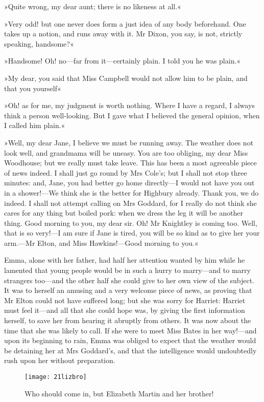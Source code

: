 »Quite wrong, my dear aunt; there is no likeness at all.«

»Very odd! but one never does form a just idea of any body beforehand. One takes up a notion, and runs away with it. Mr Dixon, you say, is not, strictly speaking, handsome?«

»Handsome! Oh! no—far from it—certainly plain. I told you he was plain.«

»My dear, you said that Miss Campbell would not allow him to be plain, and that you yourself\longdash«

»Oh! as for me, my judgment is worth nothing. Where I have a regard, I always think a person well-looking. But I gave what I believed the general opinion, when I called him plain.«

»Well, my dear Jane, I believe we must be running away. The weather does not look well, and grandmama will be uneasy. You are too obliging, my dear Miss Woodhouse; but we really must take leave. This has been a most agreeable piece of news indeed. I shall just go round by Mrs Cole's; but I shall not stop three minutes: and, Jane, you had better go home directly—I would not have you out in a shower!—We think she is the better for Highbury already. Thank you, we do indeed. I shall not attempt calling on Mrs Goddard, for I really do not think she cares for any thing but boiled pork: when we dress the leg it will be another thing. Good morning to you, my dear sir. Oh! Mr Knightley is coming too. Well, that is so very!—I am sure if Jane is tired, you will be so kind as to give her your arm.—Mr Elton, and Miss Hawkins!—Good morning to you.«

Emma, alone with her father, had half her attention wanted by him while he lamented that young people would be in such a hurry to marry—and to marry strangers too—and the other half she could give to her own view of the subject. It was to herself an amusing and a very welcome piece of news, as proving that Mr Elton could not have suffered long; but she was sorry for Harriet: Harriet must feel it—and all that she could hope was, by giving the first information herself, to save her from hearing it abruptly from others. It was now about the time that she was likely to call. If she were to meet Miss Bates in her way!—and upon its beginning to rain, Emma was obliged to expect that the weather would be detaining her at Mrs Goddard's, and that the intelligence would undoubtedly rush upon her without preparation.

\begin{figure}[tbph]
\centering
\texttt{[image: 21lizbro]}
\caption{Who should come in, but Elizabeth Martin and her brother!}
\end{figure}

